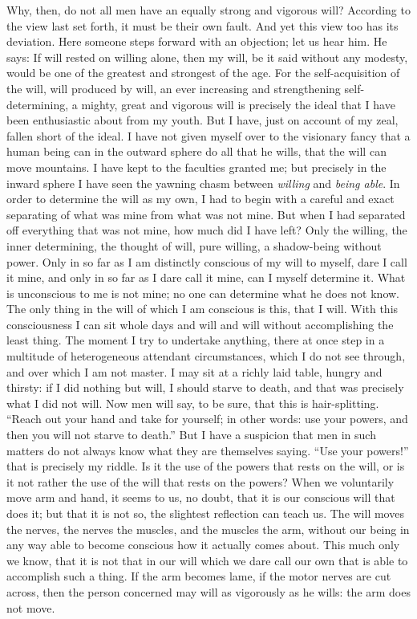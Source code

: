 \documentclass[12pt,a4paper,openany]{book}
\newcommand{\opage}[1]{\marginnote{\footnotesize\textit{[#1]}}}
\begin{document}
Why, then, do not all men have an equally strong
and vigorous will? According to the view last set forth, it must
be their own fault. And yet this view too has its deviation.
Here someone steps forward with
an objection; let us hear him. He says: If will
rested on willing alone, then my will, be it said
without any modesty, would be one of the greatest and
strongest of the age. For the self-acquisition of the will, will
produced by will, an ever increasing and strengthening
self-determining, a mighty, great and vigorous will is
precisely the ideal that I have been enthusiastic about from my youth.
But I have, just on account of my zeal, fallen short
of the ideal. I have not given myself over to the visionary
fancy that a human being can in the outward sphere do all that
he wills, that the will can move mountains. I have kept to
the faculties granted me; but precisely in the inward sphere I
have seen the yawning chasm between \emph{willing} and \emph{being able}.
In order to determine the will as my own, I had to
begin with a careful and exact separating of what
was mine from what was not mine. But when I
had separated off everything that was not mine, how much did I
have left? Only the willing, the inner determining,
the thought of will, pure willing, a shadow-being without power.
\setcounter{footnote}{0}%
\opage{5}Only in so far as I am distinctly conscious of my will to myself, dare
I call it mine, and only in so far as I dare call it
mine, can I myself determine it. What is unconscious to me
is not mine; no one can determine what he does not
know. The only thing in the will of which I am conscious is this,
that I will. With this consciousness I can sit whole days
and will and will without accomplishing the least thing. The
moment I try to undertake anything, there at once
step in a multitude of heterogeneous attendant circumstances, which
I do not see through, and over which I am not master. I
may sit at a richly laid table, hungry and thirsty:
if I did nothing but will, I should starve
to death, and that was precisely %
what I did not will. Now
men will say, to be sure, that this is hair-splitting. ``Reach out your
hand and take for yourself; in other words: use your
powers, and then you will not starve to death.'' But I have a suspicion
that men in such matters do not always know
what they are themselves saying. ``Use your powers!'' that is precisely
my riddle. Is it the use of the powers that rests on the will,
or is it not rather the use of the will that rests on
the powers? When we voluntarily move arm and hand,
it seems to us, no doubt, that it is our conscious will that
does it; but that it is not so, the slightest
reflection can teach us. The will moves the nerves, the nerves the
muscles, and the muscles the arm, without our being in any
way able to become conscious how
it actually comes about. This much only we know, that it is not
that in our will which we dare call our own that is able
to accomplish such a thing. If the arm becomes lame, if the motor nerves are cut
across, then the person concerned may will as vigorously
as he wills: the arm does not move.
\end{document}
